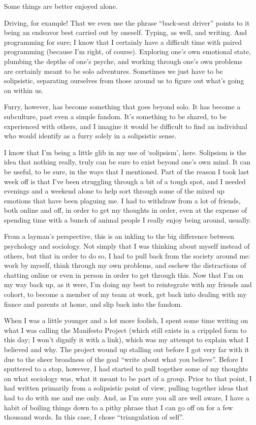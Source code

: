 Some things are better enjoyed alone.

Driving, for example! That we even use the phrase ``back-seat driver'' points to it being an endeavor best carried out by oneself. Typing, as well, and writing. And programming for sure; I know that I certainly have a difficult time with paired programming (because I'm right, of course). Exploring one's own emotional state, plumbing the depths of one's psyche, and working through one's own problems are certainly meant to be solo adventures. Sometimes we just have to be solipsistic, separating ourselves from those around us to figure out what's going on within us.

Furry, however, has become something that goes beyond solo. It has become a subculture, past even a simple fandom. It's something to be shared, to be experienced with others, and I imagine it would be difficult to find an individual who would identify as a furry solely in a solipsistic sense. 

I know that I'm being a little glib in my use of `solipsism', here. Solipsism is the idea that nothing really, truly can be sure to exist beyond one's own mind. It can be useful, to be sure, in the ways that I mentioned. Part of the reason I took last week off is that I've been struggling through a bit of a tough spot, and I needed evenings and a weekend alone to help sort through some of the mixed up emotions that have been plaguing me. I had to withdraw from a lot of friends, both online and off, in order to get my thoughts in order, even at the expense of spending time with a bunch of animal people I really enjoy being around, usually.

From a layman's perspective, this is an inkling to the big difference between psychology and sociology. Not simply that I was thinking about myself instead of others, but that in order to do so, I had to pull back from the society around me: work by myself, think through my own problems, and eschew the distractions of chatting online or even in person in order to get through this. Now that I'm on my way back up, as it were, I'm doing my best to reintegrate with my friends and cohort, to become a member of my team at work, get back into dealing with my fiance and parents at home, and slip back into the fandom.

When I was a little younger and a lot more foolish, I spent some time writing on what I was calling the Manifesto Project (which still exists in a crippled form to this day; I won't dignify it with a link), which was my attempt to explain what I believed and why. The project wound up stalling out before I got very far with it due to the sheer broadness of the goal ``write about what you believe''. Before I sputtered to a stop, however, I had started to pull together some of my thoughts on what sociology was, what it meant to be part of a group. Prior to that point, I had written primarily from a solipsistic point of view, pulling together ideas that had to do with me and me only. And, as I'm sure you all are well aware, I have a habit of boiling things down to a pithy phrase that I can go off on for a few thousand words. In this case, I chose ``triangulation of self''.


